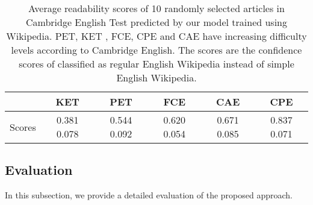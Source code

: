 \documentclass[runningheads]{llncs}
\begin{document}
\begin{table}[!h]
	\centering
	\small
	\setlength\tabcolsep{1pt}
	\begin{tabular}{c|c|c|c|c|c}
		
		& KET & PET & FCE & CAE & CPE \\
		\hline
		Scores & 0.381  0.078 & 0.544  0.092& 0.620  0.054 & 0.671  0.085 & 0.837  0.071 \\
		\hline
	\end{tabular}
	\caption{Average readability scores of 10 randomly selected articles in Cambridge English Test predicted by our model trained using Wikipedia.  PET, KET , FCE, CPE and CAE have increasing difficulty levels according to Cambridge English. The scores are the confidence scores of classified as regular English Wikipedia instead of simple English Wikipedia.}\label{tb:CEPP}
	\vspace{-1.0cm}
\end{table}

\iffalse
\begin{figure}[!h]
	\centering
	\begin{minipage}{1\linewidth}
		\centering
		\begin{subfigure}{0.4\linewidth}
			\texttt{[image: pic/ReadNet1000.pdf]}
			\caption{Model with 1000 training examples}
		\end{subfigure}
		~
		\begin{subfigure}{0.4\linewidth}
			\texttt{[image: pic/ReadNet10000.pdf]}
			\caption{Model with 10000 training examples}
		\end{subfigure}
		
		\caption{\small ROC curves (True Pos  False Pos): Wiki Task}  \label{fig:ROCedge}
	\end{minipage}
\end{figure}
\fi



\subsection{Evaluation}
In this subsection, we provide a detailed evaluation of the proposed approach.
\end{document}
